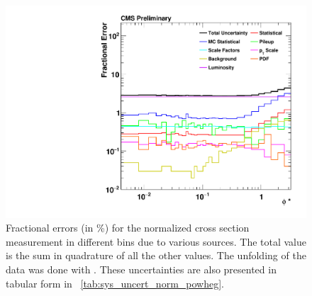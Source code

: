 \begin{figure}[!htbp]
    \centering
    \includegraphics[width=\textwidth]{figures/data_uncertainty_absolute_powheg_unfolded.pdf}
    \caption[
        Fractional errors (in \%) for the normalized cross section measurement.
    ]{
        Fractional errors (in \%) for the normalized cross section measurement in
        different \phistar bins due to various sources. The total value is the
        sum in quadrature of all the other values. The unfolding of the data
        was done with \POWHEG. These uncertainties are also presented in
        tabular form in \TAB~\ref{tab:sys_uncert_norm_powheg}.
    }
    \label{fig:sys_uncert_norm_powheg}
\end{figure}
